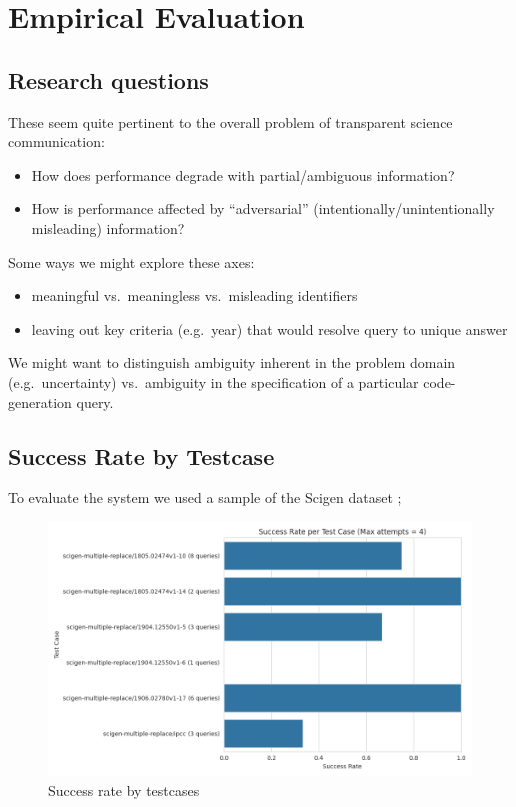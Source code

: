 \section{Empirical Evaluation}
\label{sec:evaluation}

\subsection{Research questions}

These seem quite pertinent to the overall problem of transparent science communication:
\begin{itemize}
\item How does performance degrade with partial/ambiguous information?
\item How is performance affected by ``adversarial'' (intentionally/unintentionally misleading) information?
\end{itemize}

Some ways we might explore these axes:
\begin{itemize}
\item meaningful vs.~meaningless vs.~misleading identifiers
\item leaving out key criteria (e.g.~year) that would resolve query to unique answer
\end{itemize}

We might want to distinguish ambiguity inherent in the problem domain (e.g.~uncertainty) vs.~ambiguity in the
specification of a particular code-generation query.

\subsection{Success Rate by Testcase}
To evaluate the system we used a sample of the Scigen dataset \cite{scigen_dataset_2021};
\label{subsec:success_rate_by_test_case}

\begin{figure}[!h]
    \centering
    \includegraphics[width=0.95\linewidth]{fig/success_rate_by_test_case}
    \caption{Success rate by testcases}\label{fig:success_rate_by_test_case}
\end{figure}
